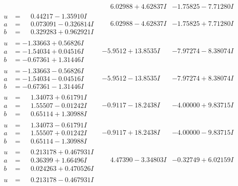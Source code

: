\documentclass[1p]{elsarticle_modified}
\theoremstyle{definition}
\begin{document}
$$\begin{array}{c|c|c}
 & \phantom{-}6.02988 + 4.62837 I & -1.75825 - 7.71280 I \\ \hline\begin{aligned}
u &= \phantom{-}0.44217 - 1.35910 I \\
a &= \phantom{-}0.073091 - 0.326814 I \\
b &= \phantom{-}0.329283 + 0.962921 I\end{aligned}
 & \phantom{-}6.02988 - 4.62837 I & -1.75825 + 7.71280 I \\ \hline\begin{aligned}
u &= -1.33663 + 0.56826 I \\
a &= -1.54034 + 0.04516 I \\
b &= -0.67361 + 1.31446 I\end{aligned}
 & -5.9512 + 13.8535 I & -7.97274 - 8.38074 I \\ \hline\begin{aligned}
u &= -1.33663 - 0.56826 I \\
a &= -1.54034 - 0.04516 I \\
b &= -0.67361 - 1.31446 I\end{aligned}
 & -5.9512 - 13.8535 I & -7.97274 + 8.38074 I \\ \hline\begin{aligned}
u &= \phantom{-}1.34073 + 0.61791 I \\
a &= \phantom{-}1.55507 - 0.01242 I \\
b &= \phantom{-}0.65114 + 1.30988 I\end{aligned}
 & -0.9117 - 18.2438 I & -4.00000 + 9.83715 I \\ \hline\begin{aligned}
u &= \phantom{-}1.34073 - 0.61791 I \\
a &= \phantom{-}1.55507 + 0.01242 I \\
b &= \phantom{-}0.65114 - 1.30988 I\end{aligned}
 & -0.9117 + 18.2438 I & -4.00000 - 9.83715 I \\ \hline\begin{aligned}
u &= \phantom{-}0.213178 + 0.467931 I \\
a &= \phantom{-}0.36399 + 1.66496 I \\
b &= \phantom{-}0.024263 + 0.470526 I\end{aligned}
 & \phantom{-}4.47390 - 3.34803 I & -0.32749 + 6.02159 I \\ \hline\begin{aligned}
u &= \phantom{-}0.213178 - 0.467931 I \\

\end{aligned}
\end{array}$$
\end{document}

